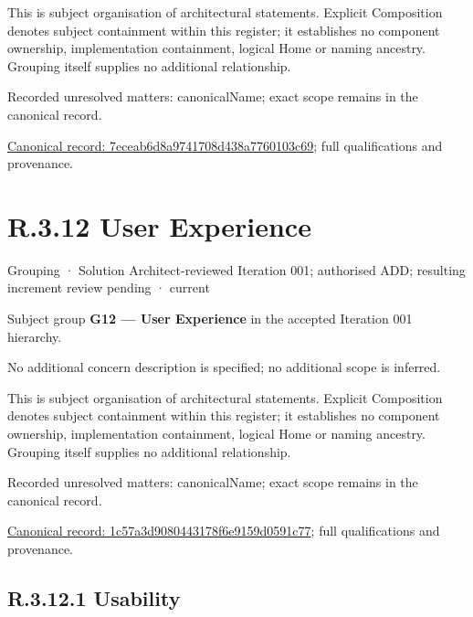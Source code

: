 This is subject organisation of architectural statements. Explicit Composition denotes subject containment within this register; it establishes no component ownership, implementation containment, logical Home or naming ancestry. Grouping itself supplies no additional relationship.


{\small Recorded unresolved matters: canonicalName; exact scope remains in the canonical record.}\par
{\footnotesize \href{../../../../continuum/grouping/7eceab6d8a9741708d438a7760103c69.md}{Canonical record: 7eceab6d8a9741708d438a7760103c69}; full qualifications and provenance.}\par
\section*{R.3.12 User Experience}
\label{navigation:R.3.12}

\label{element:1c57a3d9080443178f6e9159d0591c77}
{\small Grouping · Solution Architect-reviewed Iteration 001; authorised ADD; resulting increment review pending · current}\par

Subject group \textbf{G12 — User Experience} in the accepted Iteration 001 hierarchy.



No additional concern description is specified; no additional scope is inferred.



This is subject organisation of architectural statements. Explicit Composition denotes subject containment within this register; it establishes no component ownership, implementation containment, logical Home or naming ancestry. Grouping itself supplies no additional relationship.


{\small Recorded unresolved matters: canonicalName; exact scope remains in the canonical record.}\par
{\footnotesize \href{../../../../continuum/grouping/1c57a3d9080443178f6e9159d0591c77.md}{Canonical record: 1c57a3d9080443178f6e9159d0591c77}; full qualifications and provenance.}\par
\subsection*{R.3.12.1 Usability}
\label{navigation:R.3.12.1}

